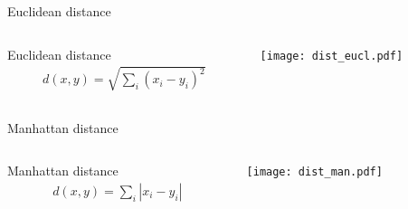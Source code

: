 \documentclass{beamer}\usepackage[]{graphicx}\usepackage[]{color}
\begin{document}
\begin{frame}[fragile]{Euclidean distance}
  \begin{columns}
    \begin{column}{.5\linewidth}
      \begin{Definition}{Euclidean distance}
        \begin{align*}
          d(x, y) = \sqrt{\sum_i (x_i - y_i)^2}
        \end{align*}
      \end{Definition}
    \end{column}
    \begin{column}{.5\linewidth}
      \begin{center}
        \texttt{[image: dist\_eucl.pdf]}
      \end{center}
    \end{column}
  \end{columns}
\end{frame}

\begin{frame}[fragile]{Manhattan distance}
  \begin{columns}
    \begin{column}{.5\linewidth}
      \begin{Definition}{Manhattan distance}
        \begin{align*}
          d(x, y) = \sum_i |x_i - y_i|
        \end{align*}
      \end{Definition}
    \end{column}
    \begin{column}{.5\linewidth}
      \begin{center}
        \texttt{[image: dist\_man.pdf]}
      \end{center}
    \end{column}
  \end{columns}
\end{frame}
\end{document}
